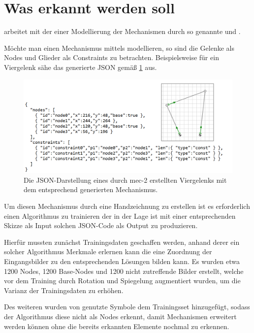 \section{Was erkannt werden soll}
 arbeitet mit der einer Modellierung der Mechanismen durch
so genannte  und .

Möchte man einen Mechanismus mittels  modellieren, so sind die Gelenke als Nodes und Glieder als Constraints zu betrachten.
Beispielsweise für ein Viergelenk sähe das generierte JSON gemäß \ref{fig:4bar} aus.

\begin{figure}
  \includegraphics[width=\textwidth]{images/4bar_json}
  \caption{Die JSON-Darstellung eines durch mec-2 erstellten Viergelenks mit dem entsprechend generierten Mechanismus.}
  \label{fig:4bar}
\end{figure}

Um diesen Mechanismus durch eine Handzeichnung zu erstellen ist es erforderlich einen Algorithmus zu trainieren der in der Lage ist mit einer entsprechenden Skizze als Input solchen JSON-Code als Output zu produzieren.

Hierfür mussten zunächst Trainingsdaten geschaffen werden, anhand derer ein solcher Algorithmus Merkmale erlernen kann die eine Zuordnung der Eingangsbilder zu den entsprechenden Lösungen bilden kann.
Es wurden etwa 1200 Nodes, 1200 Base-Nodes und 1200 nicht zutreffende Bilder erstellt, welche vor dem Training durch Rotation und Spiegelung augmentiert wurden, um die Varianz der Trainingsdaten zu erhöhen.

Des weiteren wurden von  genutzte Symbole dem Trainingsset hinzugefügt, sodass der Algorithmus diese nicht als Nodes erkennt, damit Mechanismen erweitert werden können ohne die bereits erkannten Elemente nochmal zu erkennen.

